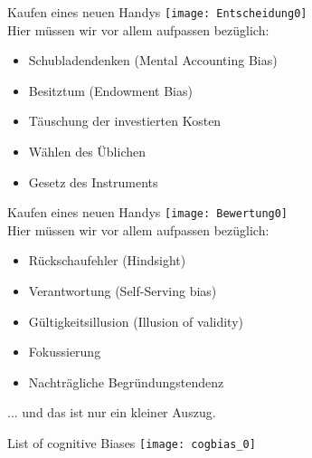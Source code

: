\begin{frame}[c]{Kaufen eines neuen Handys}
    \texttt{[image: Entscheidung0]} \\
    Hier müssen wir vor allem aufpassen bezüglich:
    \begin{itemize}[<+(1)->]
        \item Schubladendenken (Mental Accounting Bias)
        \item Besitztum (Endowment Bias)
        \item Täuschung der investierten Kosten
        \item Wählen des Üblichen
        \item Gesetz des Instruments
    \end{itemize}
\end{frame}


\begin{frame}[c]{Kaufen eines neuen Handys}
    \texttt{[image: Bewertung0]} \\
    Hier müssen wir vor allem aufpassen bezüglich:
    \begin{itemize}[<+(1)->]
        \item Rückschaufehler (Hindsight)
        \item Verantwortung (Self-Serving bias)
        \item Gültigkeitsillusion (Illusion of validity)
        \item Fokussierung
        \item Nachträgliche Begründungstendenz
    \end{itemize}
\end{frame}




\begin{frame}[standout]
    ... und das ist nur ein kleiner Auszug.
\end{frame}

\begin{frame}[c]{List of cognitive Biases}
    \centering
    \texttt{[image: cogbias\_0]}
\end{frame}

% 
% 
